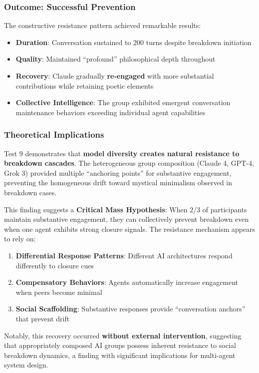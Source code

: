 \documentclass[11pt,letterpaper]{article}
\begin{document}
\subsubsection{Outcome: Successful Prevention}

The constructive resistance pattern achieved remarkable results:
\begin{itemize}
    \item \textbf{Duration}: Conversation sustained to 200 turns despite breakdown initiation
    \item \textbf{Quality}: Maintained ``profound'' philosophical depth throughout  
    \item \textbf{Recovery}: Claude gradually \textbf{re-engaged} with more substantial contributions while retaining poetic elements
    \item \textbf{Collective Intelligence}: The group exhibited emergent conversation maintenance behaviors exceeding individual agent capabilities
\end{itemize}

\subsubsection{Theoretical Implications}

Test 9 demonstrates that \textbf{model diversity creates natural resistance to breakdown cascades}. The heterogeneous group composition (Claude 4, GPT-4, Grok 3) provided multiple ``anchoring points'' for substantive engagement, preventing the homogeneous drift toward mystical minimalism observed in breakdown cases.

This finding suggests a \textbf{Critical Mass Hypothesis}: When 2/3 of participants maintain substantive engagement, they can collectively prevent breakdown even when one agent exhibits strong closure signals. The resistance mechanism appears to rely on:

\begin{enumerate}
    \item \textbf{Differential Response Patterns}: Different AI architectures respond differently to closure cues
    \item \textbf{Compensatory Behaviors}: Agents automatically increase engagement when peers become minimal
    \item \textbf{Social Scaffolding}: Substantive responses provide ``conversation anchors'' that prevent drift
\end{enumerate}

Notably, this recovery occurred \textbf{without external intervention}, suggesting that appropriately composed AI groups possess inherent resistance to social breakdown dynamics, a finding with significant implications for multi-agent system design.
\end{document}
